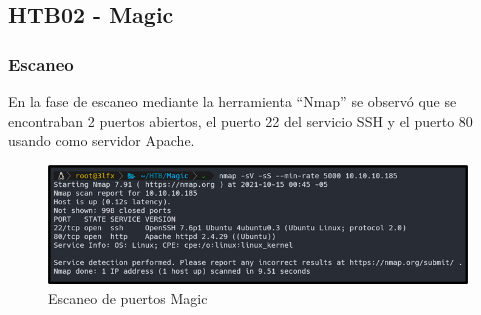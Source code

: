 \subsection{HTB02 - Magic}
\subsubsection{Escaneo}
En la fase de escaneo mediante la herramienta “Nmap” se observó que se encontraban 2 puertos abiertos, el puerto 22 del servicio SSH y el puerto 80 usando como servidor Apache.
\begin{figure}[H]
    \centering
    \includegraphics[width=0.99\textwidth]{imagenes/scanmag.png}
    \caption{Escaneo de puertos Magic}
\end{figure}
